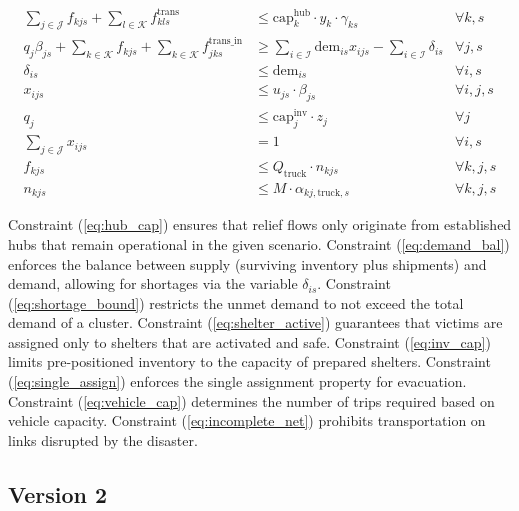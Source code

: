 \begin{align}
    \sum_{j \in \mathcal{J}} f_{kjs} + \sum_{l \in \mathcal{K}} f_{kls}^{\text{trans}} & \le \text{cap}_k^{\text{hub}} \cdot y_k \cdot \gamma_{ks} & \forall k, s \label{eq:hub_cap} \\
    q_j \beta_{js} + \sum_{k \in \mathcal{K}} f_{kjs} + \sum_{k \in \mathcal{K}} f_{jks}^{\text{trans\_in}} & \ge \sum_{i \in \mathcal{I}} \text{dem}_{is} x_{ijs} - \sum_{i \in \mathcal{I}} \delta_{is} & \forall j, s \label{eq:demand_bal} \\
    \delta_{is} & \le \text{dem}_{is} & \forall i, s \label{eq:shortage_bound} \\
    x_{ijs} & \le u_{js} \cdot \beta_{js} & \forall i, j, s \label{eq:shelter_active} \\
    q_j & \le \text{cap}_j^{\text{inv}} \cdot z_j & \forall j \label{eq:inv_cap} \\
    \sum_{j \in \mathcal{J}} x_{ijs} & = 1 & \forall i, s \label{eq:single_assign} \\
    f_{kjs} & \le Q_{\text{truck}} \cdot n_{kjs} & \forall k, j, s \label{eq:vehicle_cap} \\
    n_{kjs} & \le M \cdot \alpha_{kj, \text{truck}, s} & \forall k, j, s \label{eq:incomplete_net}
\end{align}

\noindent Constraint (\ref{eq:hub_cap}) ensures that relief flows only originate from established hubs that remain operational in the given scenario.
Constraint (\ref{eq:demand_bal}) enforces the balance between supply (surviving inventory plus shipments) and demand, allowing for shortages via the variable $\delta_{is}$.
Constraint (\ref{eq:shortage_bound}) restricts the unmet demand to not exceed the total demand of a cluster.
Constraint (\ref{eq:shelter_active}) guarantees that victims are assigned only to shelters that are activated and safe.
Constraint (\ref{eq:inv_cap}) limits pre-positioned inventory to the capacity of prepared shelters.
Constraint (\ref{eq:single_assign}) enforces the single assignment property for evacuation.
Constraint (\ref{eq:vehicle_cap}) determines the number of trips required based on vehicle capacity.
Constraint (\ref{eq:incomplete_net}) prohibits transportation on links disrupted by the disaster.

\subsection{Version 2}

